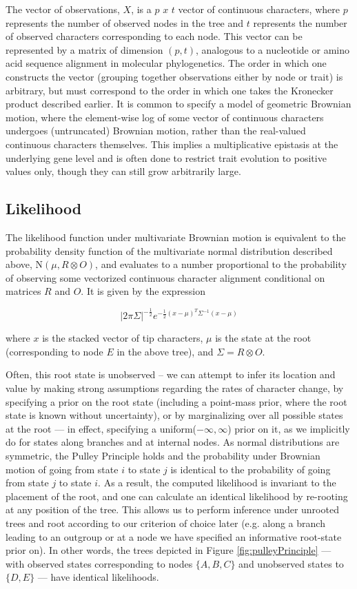 The vector of observations, $X$, is a $p$ $x$ $t$ vector of continuous characters, where $p$ represents the number of observed nodes in the tree and $t$ represents the number of observed characters corresponding to each node. This vector can be represented by a matrix of dimension $(p, t)$, analogous to a nucleotide or amino acid sequence alignment in molecular phylogenetics. The order in which one constructs the vector (grouping together observations either by node or trait) is arbitrary, but must correspond to the order in which one takes the Kronecker product described earlier. It is common to specify a model of geometric Brownian motion, where the element-wise log of some vector of continuous characters undergoes (untruncated) Brownian motion, rather than the real-valued continuous characters themselves. This implies a multiplicative epistasis at the underlying gene level and is often done to restrict trait evolution to positive values only, though they can still grow arbitrarily large. 

\subsection{Likelihood}
The likelihood function under multivariate Brownian motion is equivalent to the probability density function of the multivariate normal distribution described above, N$(\mu, R \otimes O)$, and evaluates to a number proportional to the probability of observing some vectorized continuous character alignment conditional on matrices $R$ and $O$. It is given by the expression

{\large\[|2\pi\Sigma|^{-\frac{1}{2}}e^{-\frac{1}{2}(x-\mu)^T\Sigma^{-1}(x-\mu)}\]}

where $x$ is the stacked vector of tip characters, $\mu$ is the state at the root (corresponding to node $E$ in the above tree), and $\Sigma = R \otimes O$.

Often, this root state is unobserved – we can attempt to infer its location and value by making strong assumptions regarding the rates of character change, by specifying a prior on the root state (including a point-mass prior, where the root state is known without uncertainty), or by marginalizing over all possible states at the root — in effect, specifying a uniform($-\infty, \infty$) prior on it, as we implicitly do for states along branches and at internal nodes. As normal distributions are symmetric, the Pulley Principle holds \citep{felsensteinEvolutionaryTreesGene1981} and the probability under Brownian motion of going from state $i$ to state $j$ is identical to the probability of going from state $j$ to state $i$. As a result, the computed likelihood is invariant to the placement of the root, and one can calculate an identical likelihood by re-rooting at any position of the tree. This allows us to perform inference under unrooted trees and root according to our criterion of choice later (e.g. along a branch leading to an outgroup or at a node we have specified an informative root-state prior on). In other words, the trees depicted in Figure \ref{fig:pulleyPrinciple} — with observed states corresponding to nodes $\{A, B, C\}$ and unobserved states to $\{D, E\}$ — have identical likelihoods.

